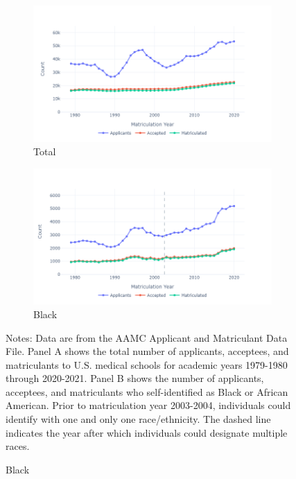 \documentclass[12pt]{article}
\begin{document}
\onehalfspacing



\clearpage


\begin{figure}[hp]
 \centering
 \caption{Applicants, Acceptees, and Matriculants, 1979-2020}
 \label{fig:app}
 \begin{subfigure}{0.9\textwidth}
  \centering
  \includegraphics[width=\textwidth]{figs/applicant_count_total.png}
  \caption{Total}
  \label{fig:app_total}
\end{subfigure}
 \begin{subfigure}{0.9\textwidth}
   \centering
   \includegraphics[width=\textwidth]{figs/applicant_count_black.png}
   \caption{Black}
   \label{fig:app_black}
 \end{subfigure} 
      \begin{minipage}{0.9\textwidth}
      \footnotesize Notes: Data are from the AAMC Applicant and Matriculant Data File. Panel A shows the total number of applicants, acceptees, and matriculants to U.S. medical schools for academic years 1979-1980 through 2020-2021. Panel B shows the number of applicants, acceptees, and matriculants who self-identified as Black or African American. Prior to matriculation year 2003-2004, individuals could identify with one and only one race/ethnicity. The dashed line indicates the year after which individuals could designate multiple races. 
      \end{minipage}
\end{figure}
\end{document}
